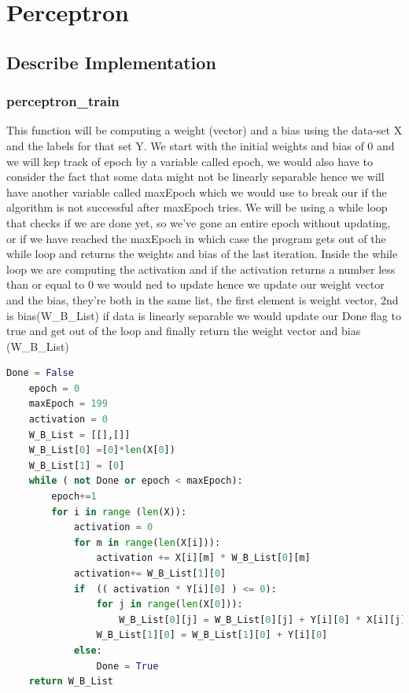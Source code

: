 \documentclass{article}
\begin{document}
	\section{Perceptron}
	\subsection{Describe Implementation}
	\subsubsection{perceptron\_train}
	This function will be computing a weight (vector) and a bias using the data-set X and the labels for that set Y. We start with the initial weights and bias of 0 and we will kep track of epoch by a variable called epoch, we would also have to consider the fact that some data might not be linearly separable hence we will have another variable called maxEpoch which we would use to break our if the algorithm is not successful after maxEpoch tries. We will be using a while loop that checks if we are done yet, so we've gone an entire epoch without updating, or if we have reached the maxEpoch in which case the program gets out of the while loop and returns the weights and bias of the last iteration. Inside the while loop we are computing the activation and if the activation returns a number less than or equal to 0 we would ned to update hence we update our weight vector and the bias, they're both in the same list, the first element is weight vector, 2nd is bias(W\_B\_List) if data is linearly separable we would update our Done flag to true and get out of the loop and finally return the weight vector and bias (W\_B\_List)
	\begin{lstlisting}[language=Python]
	Done = False 
	epoch = 0 
	maxEpoch = 199
	activation = 0 
	W_B_List = [[],[]] 
	W_B_List[0] =[0]*len(X[0]) 
	W_B_List[1] = [0]
	while ( not Done or epoch < maxEpoch): 
		epoch+=1
		for i in range (len(X)):
			activation = 0
			for m in range(len(X[i])):
				activation += X[i][m] * W_B_List[0][m]
			activation+= W_B_List[1][0]
			if  (( activation * Y[i][0] ) <= 0):
				for j in range(len(X[0])):
					W_B_List[0][j] = W_B_List[0][j] + Y[i][0] * X[i][j]
				W_B_List[1][0] = W_B_List[1][0] + Y[i][0]
			else:
				Done = True 
	return W_B_List
	\end{lstlisting}
	
\end{document}
